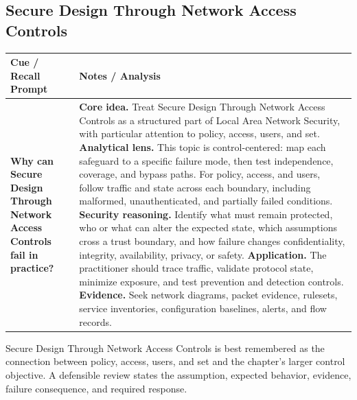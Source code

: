 \documentclass[11pt]{article}
\newcommand{\CornellHeader}{%
\rowcolor{Navy}\color{white}\bfseries Cue / Recall Prompt & \color{white}\bfseries Notes / Analysis\\\hline}
\newcommand{\CornellRow}[2]{%
\cellcolor{CueGray}\RaggedRight\textbf{#1} & \RaggedRight #2\\\hline}
\begin{document}
\subsection*{Secure Design Through Network Access Controls}
\begin{longtable}{>{\RaggedRight\arraybackslash}p{}|>{\RaggedRight\arraybackslash}p{}}
\CornellHeader
\CornellRow{Why can Secure Design Through Network Access Controls fail in practice?}{\textbf{Core idea.} Treat Secure Design Through Network Access Controls as a structured part of Local Area Network Security, with particular attention to policy, access, users, and set. \textbf{Analytical lens.} This topic is control-centered: map each safeguard to a specific failure mode, then test independence, coverage, and bypass paths. For policy, access, and users, follow traffic and state across each boundary, including malformed, unauthenticated, and partially failed conditions. \textbf{Security reasoning.} Identify what must remain protected, who or what can alter the expected state, which assumptions cross a trust boundary, and how failure changes confidentiality, integrity, availability, privacy, or safety. \textbf{Application.} The practitioner should trace traffic, validate protocol state, minimize exposure, and test prevention and detection controls. \textbf{Evidence.} Seek network diagrams, packet evidence, rulesets, service inventories, configuration baselines, alerts, and flow records.}
\end{longtable}
\begin{topicsummary}
Secure Design Through Network Access Controls is best remembered as the connection between policy, access, users, and set and the chapter's larger control objective. A defensible review states the assumption, expected behavior, evidence, failure consequence, and required response.
\end{topicsummary}
\end{document}
